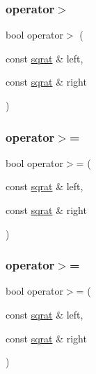 \mbox{\label{classsqrat_a0a9ebc0afb8356e073d69a69d1450a65}} 
\subsubsection{\texorpdfstring{operator$>$}{operator>}\hspace{0.1cm}{\footnotesize\ttfamily [3/3]}}
{\footnotesize\ttfamily bool operator$>$ (\begin{DoxyParamCaption}\item[{const \mbox{\hyperlink{classsqrat}{sqrat}} \&}]{left,  }\item[{const \mbox{\hyperlink{classsqrat}{sqrat}} \&}]{right }\end{DoxyParamCaption})\hspace{0.3cm}{\ttfamily [friend]}}

\mbox{\label{classsqrat_adac0450048dc40c698aa22f334e280a1}} 
\subsubsection{\texorpdfstring{operator$>$=}{operator>=}\hspace{0.1cm}{\footnotesize\ttfamily [1/3]}}
{\footnotesize\ttfamily bool operator$>$= (\begin{DoxyParamCaption}\item[{const \mbox{\hyperlink{classsqrat}{sqrat}} \&}]{left,  }\item[{const \mbox{\hyperlink{classsqrat}{sqrat}} \&}]{right }\end{DoxyParamCaption})\hspace{0.3cm}{\ttfamily [friend]}}

\mbox{\label{classsqrat_adac0450048dc40c698aa22f334e280a1}} 
\subsubsection{\texorpdfstring{operator$>$=}{operator>=}\hspace{0.1cm}{\footnotesize\ttfamily [2/3]}}
{\footnotesize\ttfamily bool operator$>$= (\begin{DoxyParamCaption}\item[{const \mbox{\hyperlink{classsqrat}{sqrat}} \&}]{left,  }\item[{const \mbox{\hyperlink{classsqrat}{sqrat}} \&}]{right }\end{DoxyParamCaption})\hspace{0.3cm}{\ttfamily [friend]}}

